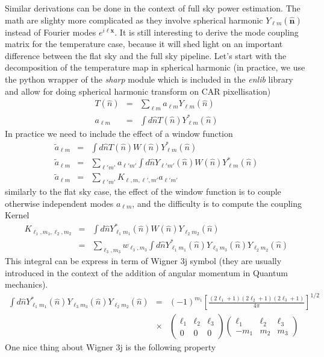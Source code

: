 \documentclass[a4paper, 11pt]{article}
\def\ba{\begin{eqnarray}}
\def\ea{\end{eqnarray}}
\begin{document}
Similar derivations can be done in the context of full sky power estimation. The math are slighty more complicated as they involve spherical harmonic $Y_{\ell m} (\bm{\hat{n}})$ instead of Fourier modes $e^{i\bm{\ell}\bm{x}}$. It is still interesting to derive the mode coupling matrix for the temperature case, because it will shed light on an important difference between the flat sky and the full sky pipeline. Let's start with the decomposition of the temperature map in spherical harmonic (in practice, we use the python wrapper of the {\it sharp} module which is included in the {\it enlib} library and allow for doing spherical harmonic transform on CAR pixellisation) 
\ba
T(\hat{n}) &=& \sum_{\ell m} a_{\ell m} Y_{\ell m}(\hat{n}) \\
a_{\ell m} &=& \int d \hat{n} T(\hat{n})  Y^{*}_{\ell m}(\hat{n})
\ea
In practice we need to include the effect of a window function
\ba
\tilde{a}_{\ell m} &=& \int d \hat{n} T(\hat{n}) W(\hat{n}) Y^{*}_{\ell m}(\hat{n}) \\
\tilde{a}_{\ell m} &=& \sum_{\ell' m'} a_{\ell' m'} \int d \hat{n} Y_{\ell' m'}(\hat{n}) W(\hat{n}) Y^{*}_{\ell m}(\hat{n}) \\
\tilde{a}_{\ell m} &=& \sum_{\ell' m'} K_{\ell,m, \ell', m'} a_{\ell' m'} 
\ea
similarly to the flat sky case, the effect of the window function is to couple otherwise independent modes $a_{\ell m} $, and the difficulty is to compute the coupling Kernel
\ba
K_{\ell_1,m_1, \ell_2, m_2} &=& \int d \hat{n} Y^{*}_{\ell_1 m_1}(\hat{n}) W(\hat{n}) Y_{\ell_2 m_2}(\hat{n}) \\
&=& \sum_{ \ell_3, m_3} w_{ \ell_3, m_3}  \int d \hat{n} Y^{*}_{\ell_1 m_1}(\hat{n}) Y_{\ell_3 m_3} (\hat{n}) Y_{\ell_2 m_2}(\hat{n})
\ea
This integral can be express in term of Wigner 3j symbol (they are usually introduced in the context of the addition of angular momentum in Quantum mechanics).
 \ba
\int d \hat{n} Y^{*}_{\ell_1 m_1}(\hat{n}) Y_{\ell_3 m_3} (\hat{n}) Y_{\ell_2 m_2}(\hat{n}) &=& (-1)^{m_1} \left[\frac{(2\ell_1+1) (2\ell_2+1) (2\ell_3+1)}{4\pi} \right]^{1/2} \\ \nonumber
&\times& \left(\begin{array}{clcr}
\ell_1 & \ell_2 & \ell_3\\
0 & 0 & 0 \end{array}\right)
\left(\begin{array}{clcr}
\ell_1 & \ell_2 & \ell_3\\
-m_{1} & m_{2} & m_{3} \end{array}\right)
\ea
One nice thing about Wigner 3j is the following property
\end{document}
